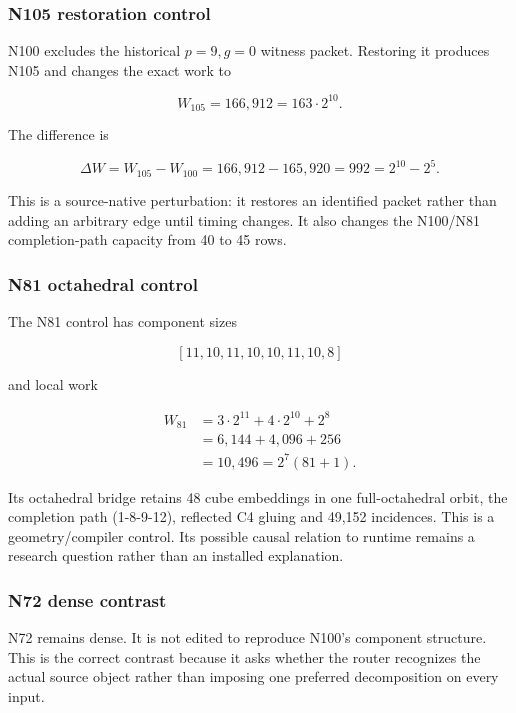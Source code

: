 \subsubsection{N105 restoration control}\label{viii-ch01-n105-restoration-control}

N100 excludes the historical \(p=9,g=0\) witness packet. Restoring it
produces N105 and changes the exact work to

\[
W_{105}=166{,}912=163\cdot2^{10}.
\]

The difference is

\[
\Delta W=W_{105}-W_{100}
=166{,}912-165{,}920
=992
=2^{10}-2^5.
\]

This is a source-native perturbation: it restores an identified packet
rather than adding an arbitrary edge until timing changes. It also
changes the N100/N81 completion-path capacity from 40 to 45 rows.

\subsubsection{N81 octahedral control}\label{viii-ch01-n81-octahedral-control-1}

The N81 control has component sizes

\[
[11,10,11,10,10,11,10,8]
\]

and local work

\[
\begin{aligned}
W_{81}&=3\cdot2^{11}+4\cdot2^{10}+2^8\\
&=6{,}144+4{,}096+256\\
&=10{,}496=2^7(81+1).
\end{aligned}
\]

Its octahedral bridge retains 48 cube embeddings in one full-octahedral
orbit, the completion path (1-8-9-12), reflected C4 gluing and 49,152
incidences. This is a geometry/compiler control. Its possible causal
relation to runtime remains a research question rather than an installed
explanation.

\subsubsection{N72 dense contrast}\label{viii-ch01-n72-dense-contrast-1}

N72 remains dense. It is not edited to reproduce N100's component
structure. This is the correct contrast because it asks whether the
router recognizes the actual source object rather than imposing one
preferred decomposition on every input.

